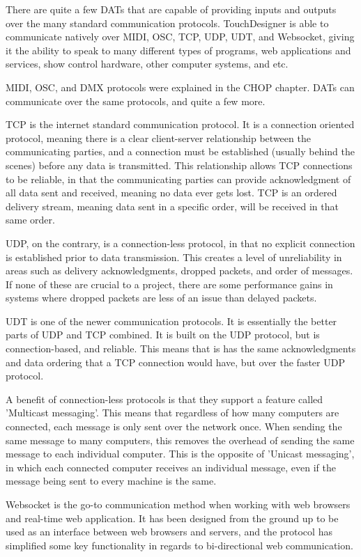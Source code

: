 \begin{fullwidth}

There are quite a few DATs that are capable of providing inputs and outputs over the many standard communication protocols. TouchDesigner is able to communicate natively over MIDI, OSC, TCP, UDP, UDT, and Websocket, giving it the ability to speak to many different types of programs, web applications and services, show control hardware, other computer systems, and etc.

MIDI, OSC, and DMX protocols were explained in the CHOP chapter. DATs can communicate over the same protocols, and quite a few more.

TCP is the internet standard communication protocol. It is a connection oriented protocol, meaning there is a clear client-server relationship between the communicating parties, and a connection must be established (usually behind the scenes) before any data is transmitted. This relationship allows TCP connections to be reliable, in that the communicating parties can provide acknowledgment of all data sent and received, meaning no data ever gets lost. TCP is an ordered delivery stream, meaning data sent in a specific order, will be received in that same order.

UDP, on the contrary, is a connection-less protocol, in that no explicit connection is established prior to data transmission. This creates a level of unreliability in areas such as delivery acknowledgments, dropped packets, and order of messages. If none of these are crucial to a project, there are some performance gains in systems where dropped packets are less of an issue than delayed packets. 

UDT is one of the newer communication protocols. It is essentially the better parts of UDP and TCP combined. It is built on the UDP protocol, but is connection-based, and reliable. This means that is has the same acknowledgments and data ordering that a TCP connection would have, but over the faster UDP protocol.

A benefit of connection-less protocols is that they support a feature called 'Multicast messaging'. This means that regardless of how many computers are connected, each message is only sent over the network once. When sending the same message to many computers, this removes the overhead of sending the same message to each individual computer. This is the opposite of 'Unicast messaging', in which each connected computer receives an individual message, even if the message being sent to every machine is the same.

Websocket is the go-to communication method when working with web browsers and real-time web application. It has been designed from the ground up to be used as an interface between web browsers and servers, and the protocol has simplified some key functionality in regards to bi-directional web communication. 


\end{fullwidth}